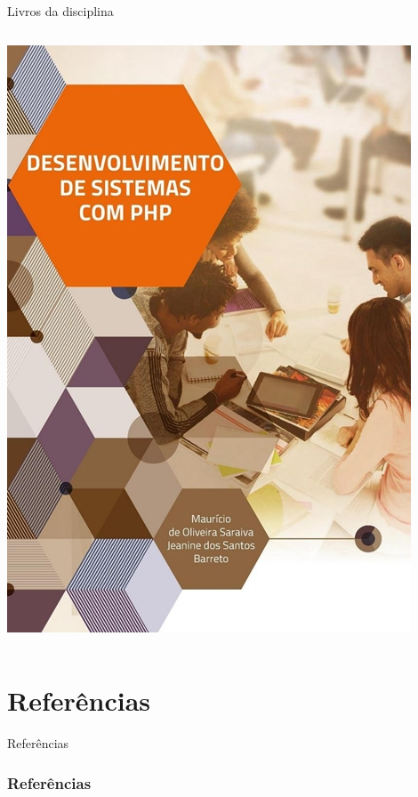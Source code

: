 \documentclass{beamer}
\begin{document}
\begin{frame}{Livros da disciplina}
\begin{columns}
\begin{column}{0.4\textwidth}
     \includegraphics[height=0.4\paperheight]{fig/aula1/saraiva2018php.png} \\
     \cite{saraiva2018php}
    \end{column}
\end{columns}
\end{frame}

\section{Referências}
\begin{frame}{Referências}%
\frametitle{Referências}
\small
\begin{center}
\tiny


\end{center}
\end{frame}
 
\end{document}
